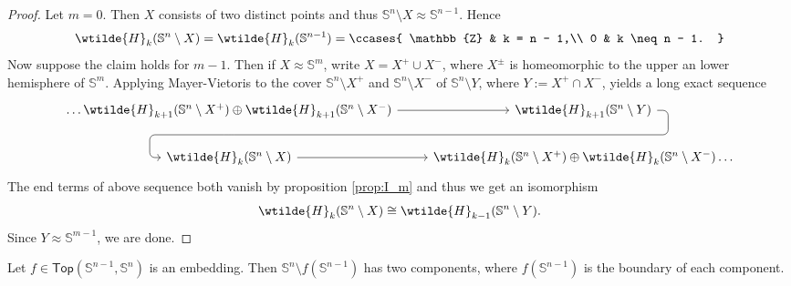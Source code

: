 \begin{proof}
	Let $m = 0$. Then $X$ consists of two distinct points and thus $\mathbb{S}^n \setminus X \approx \mathbb{S}^{n - 1}$. Hence 
	\begin{equation*}
		\wtilde{H}_k(\mathbb{S}^n \setminus X) = \wtilde{H}_k(\mathbb{S}^{n - 1}) = \ccases{
			\mathbb{Z} & k = n - 1,\\
			0 & k \neq n - 1.
		}
	\end{equation*}
	Now suppose the claim holds for $m - 1$. Then if $X \approx \mathbb{S}^m$, write $X = X^+ \cup X^-$, where $X^{\pm}$ is homeomorphic to the upper an lower hemisphere of $\mathbb{S}^m$. Applying Mayer-Vietoris to the cover $\mathbb{S}^n \setminus X^+$ and $\mathbb{S}^n \setminus X^-$ of $\mathbb{S}^n \setminus Y$, where $Y := X^+ \cap X^-$, yields a long exact sequence
	\begin{equation*}
		\begin{tikzcd}
			\dots\wtilde{H}_{k + 1}(\mathbb{S}^n \setminus X^+) \oplus \wtilde{H}_{k + 1}(\mathbb{S}^n\setminus X^-) \arrow[d, phantom, ""{coordinate, name=Z}]\arrow[r] & \wtilde{H}_{k + 1}(\mathbb{S}^n\setminus Y) \arrow[dl,rounded corners,
				to path=
				{ -- ([xshift=2ex]\tikztostart.east)
				|- (Z) [near end]\tikztonodes
				-| ([xshift=-2ex]\tikztotarget.west)
				-- (\tikztotarget)}
			] \\
			\wtilde{H}_k(\mathbb{S}^n \setminus X) \arrow[r] & \wtilde{H}_k(\mathbb{S}^n \setminus X^+) \oplus \wtilde{H}_k(\mathbb{S}^n\setminus X^-)\dots
		\end{tikzcd}
	\end{equation*}
	The end terms of above sequence both vanish by proposition \ref{prop:I_m} and thus we get an isomorphism
	\begin{equation*}
		\wtilde{H}_k(\mathbb{S}^n \setminus X) \cong \wtilde{H}_{k - 1}(\mathbb{S}^n \setminus Y).
	\end{equation*}
	Since $Y \approx \mathbb{S}^{m - 1}$, we are done.
\end{proof}

\begin{theorem}
	Let $f \in \mathsf{Top}(\mathbb{S}^{n-1},\mathbb{S}^n)$ is an embedding. Then $\mathbb{S}^n \setminus f(\mathbb{S}^{n - 1})$ has two components, where $f(\mathbb{S}^{n - 1})$ is the boundary of each component.
\end{theorem}

